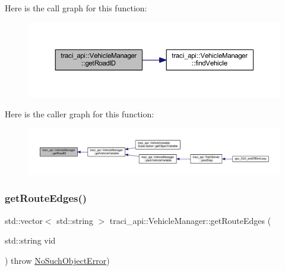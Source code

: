 Here is the call graph for this function\+:
\nopagebreak
\begin{figure}[H]
\begin{center}
\leavevmode
\includegraphics[width=350pt]{classtraci__api_1_1_vehicle_manager_a3cbdffab3f5fd337a6de08a14b87803e_cgraph}
\end{center}
\end{figure}
Here is the caller graph for this function\+:
\nopagebreak
\begin{figure}[H]
\begin{center}
\leavevmode
\includegraphics[width=350pt]{classtraci__api_1_1_vehicle_manager_a3cbdffab3f5fd337a6de08a14b87803e_icgraph}
\end{center}
\end{figure}
\mbox{\label{classtraci__api_1_1_vehicle_manager_a399053f44944093adf9a00536bf86bba}} 
\subsubsection{\texorpdfstring{get\+Route\+Edges()}{getRouteEdges()}}
{\footnotesize\ttfamily std\+::vector$<$ std\+::string $>$ traci\+\_\+api\+::\+Vehicle\+Manager\+::get\+Route\+Edges (\begin{DoxyParamCaption}\item[{std\+::string}]{vid }\end{DoxyParamCaption}) throw  \hyperlink{classtraci__api_1_1_no_such_object_error}{No\+Such\+Object\+Error}) }

